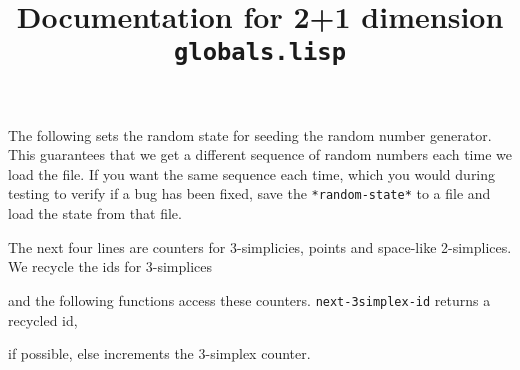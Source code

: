 \documentclass[12pt,a4paper,landscape]{article}
\title{Documentation for 2+1 dimension \texttt{globals.lisp}}
\begin{document}
 
\maketitle

The following sets the random state for seeding the random number generator. This guarantees that we
get a different sequence of random numbers each time we load the file. If you want the same sequence
each time, which you would during testing to verify if a bug has been fixed, save the 
\texttt{*random-state*} to a file and load the state from that file.



The next four lines are counters for 3-simplicies, points and space-like 2-simplices. We recycle the 
ids for 3-simplices

and the following functions access these counters. \texttt{next-3simplex-id} returns a recycled id,

if possible, else increments the 3-simplex counter.
\end{document}
